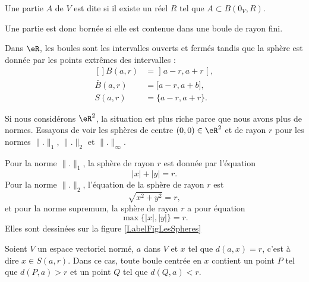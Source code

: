 \begin{definition}
	Une partie $A$ de $V$ est dite  si il existe un réel $R$ tel que $A\subset B(0_V,R)$.
\end{definition}
Une partie est donc bornée si elle est contenue dans une boule de rayon fini.

\begin{example}
	Dans $\eR$, les boules sont  les intervalles ouverts et fermés tandis que la sphère est donnée par les points extrêmes des intervalles :
	\begin{equation}
		\begin{aligned}[]
			B(a,r)&=\mathopen] a-r , a+r \mathclose[,\\
			\bar B(a,r)&=\mathopen[ a-r , a+b \mathclose],\\
			S(a,r)&=\{ a-r,a+r \}.
		\end{aligned}
	\end{equation}
\end{example}

\begin{example}
	Si nous considérons $\eR^2$, la situation est plus riche parce que nous avons plus de normes. Essayons de voir les sphères de centre $(0,0)\in\eR^2$ et de rayon $r$ pour les normes $\| . \|_1$, $\| . \|_2$ et $\| . \|_{\infty}$.

	Pour la norme $\| . \|_1$, la sphère de rayon $r$ est donnée par l'équation
	\begin{equation}
		| x |+| y |=r.
	\end{equation}
	Pour la norme $\| . \|_2$, l'équation de la sphère de rayon $r$ est
	\begin{equation}
		\sqrt{x^2+y^2}=r,
	\end{equation}
	et pour la norme supremum, la sphère de rayon $r$ a pour équation
	\begin{equation}
		\max\{ | x |,| y | \}=r.
	\end{equation}
	Elles sont dessinées sur la figure \ref{LabelFigLesSpheres}
\newcommand{\CaptionFigLesSpheres}{Les sphères de rayon $1$ pour les trois normes classiques.}

\end{example}

\newcommand{\CaptionFigBoulePtLoin}{Le point $P$ est un peu plus loin que $x$, en suivant la même droite.}


\begin{proposition}		\label{PropBoitPtLoin}
	Soient $V$ un espace vectoriel normé, $a$ dans $V$ et $x$ tel que $d(a,x)=r$, c'est à dire $x\in S(a,r)$. Dans ce cas, toute boule centrée en $x$ contient un point $P$ tel que $d(P,a)>r$ et un point $Q$ tel que $d(Q,a)<r$.
\end{proposition}

